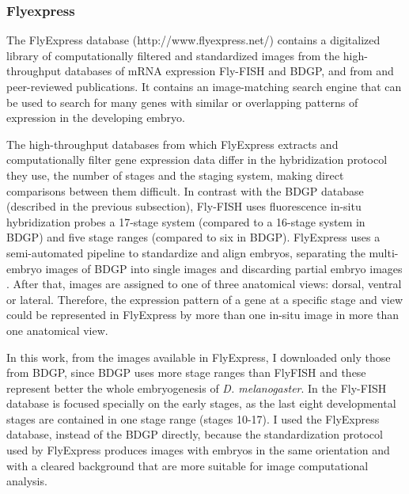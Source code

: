 
\subsubsection{Flyexpress}

The FlyExpress database (http://www.flyexpress.net/) contains a digitalized library of computationally filtered and standardized images from the high-throughput databases of mRNA expression Fly-FISH and BDGP, and from and peer-reviewed publications. It contains an image-matching search engine that can be used to search for many genes with similar or overlapping patterns of expression in the developing embryo.

The high-throughput databases from which FlyExpress extracts and computationally filter gene expression data differ in the hybridization protocol they use, the number of stages and the staging system, making direct comparisons between them difficult.
In contrast with the BDGP database (described in the previous subsection), Fly-FISH uses fluorescence in-situ hybridization probes \citep{Lecuyer2007} a 17-stage system (compared to a 16-stage system in BDGP) and five stage ranges (compared to six in BDGP).
FlyExpress uses a semi-automated pipeline to standardize and align embryos, separating the multi- embryo images of BDGP into single images and discarding partial embryo images \citep{Konikoff2012}. 
After that, images are assigned to one of three anatomical views: dorsal, ventral or lateral. Therefore, the expression pattern of a gene at a specific stage and view could be represented in FlyExpress by more than one in-situ image in more than one anatomical view.


In this work, from the images available in FlyExpress, I downloaded only those from BDGP, since BDGP uses more stage ranges than FlyFISH and these represent better the whole embryogenesis of \textit{D. melanogaster}. In the Fly-FISH database is focused specially on the early stages, as the last eight developmental stages are contained in one stage range (stages 10-17).
I used the FlyExpress database, instead of the BDGP directly, because the standardization protocol used by FlyExpress produces images with embryos in the same orientation and with a cleared background that are more suitable for image computational analysis.


